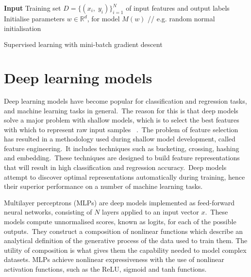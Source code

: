 \bigskip

\begin{algorithm}[H]
	\SetAlgoLined
	\textbf{Input} 
	Training set $ D = \{(x_i, \; y_i)\}_{i=1}^N $ of input features and output labels \\
	Initialise parameters $ w \in \mathbb{R}^d $, for model $ M(w) $ // e.g. random normal initialisation \\
	\caption{Supervised learning with mini-batch gradient descent}
\end{algorithm}



\section{Deep learning models}

Deep learning models have become popular for classification and regression tasks, and machine learning tasks in general.\ The reason for this is that deep models solve a major problem with shallow models, which is to select the best features with which to represent raw input samples \unskip ~\citep{Goodfellow-et-al-2016}.\ The problem of feature selection has resulted in a methodology used during shallow model development, called feature engineering.\ It includes techniques such as bucketing, crossing, hashing and embedding.\ These techniques are designed to build feature representations that will result in high classification and regression accuracy.\ Deep models attempt to discover optimal representations automatically during training, hence their superior performance on a number of machine learning tasks. \par

\noindent Multilayer perceptrons (MLPs) are deep models implemented as feed-forward neural networks, consisting of $N$ layers applied to an input vector $ x $.\ These models compute unnormalised scores, known as logits, for each of the possible outputs.\ They construct a composition of nonlinear functions which describe an analytical definition of the generative process of the data used to train them. The utility of composition is what gives them the capability needed to model complex datasets. MLPs achieve nonlinear expressiveness with the use of nonlinear activation functions, such as the ReLU, sigmoid and tanh functions.  \par

